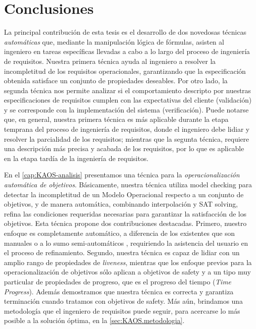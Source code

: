 \section{Conclusiones}
La principal contribuci\'on de esta tesis es el desarrollo de dos novedosas t\'ecnicas \emph{autom\'aticas} que, mediante la manipulaci\'on l\'ogica de f\'ormulas, asisten al ingeniero en tareas espec\'ificas llevadas a cabo a lo largo del proceso de ingenier\'ia de requisitos. 
Nuestra primera t\'ecnica ayuda al ingeniero a resolver la incompletitud de los requisitos operacionales, garantizando que la especificaci\'on obtenida satisface un conjunto de propiedades deseables. 
Por otro lado, la segunda t\'ecnica nos permite analizar si el comportamiento descripto por nuestras especificaciones de requisitos cumplen con las expectativas del cliente (validaci\'on) y se corresponde con la implementaci\'on del sistema (verificaci\'on).
Puede notarse que, en general, nuestra primera t\'ecnica es m\'as aplicable durante la etapa temprana del proceso de ingenier\'ia de requisitos, donde el ingeniero debe lidiar y resolver la parcialidad de los requisitos; mientras que la segunta t\'ecnica, requiere una descripci\'on m\'as precisa y acabada de los requisitos, por lo que es aplicable en la etapa tard\'ia de la ingenier\'ia de requisitos.


En el \cref{cap:KAOS-analisis} presentamos una t\'ecnica para la \emph{operacionalizaci\'on autom\'atica de objetivos}. B\'asicamente, nuestra t\'ecnica utiliza model checking para detectar la incompletitud de un Modelo Operacional respecto a un conjunto de objetivos, y de manera autom\'atica, combinando interpolaci\'on y SAT solving, refina las condiciones requeridas necesarias para garantizar la satisfacci\'on de los objetivos. Esta t\'ecnica propone dos contribuciones destacadas.
Primero, nuestro enfoque es completamente autom\'atico, a diferencia de los existentes que son manuales \cite{LetierVanLamsweerde2002} o a lo sumo semi-autom\'aticos \cite{Alrajeh+2009}, requiriendo la asistencia del usuario en el proceso de refinamiento. Segundo, nuestra t\'ecnica es capaz de lidiar con un amplio rango de propiedades de \emph{liveness}, mientras que los enfoque previos para la operacionalizaci\'on de objetivos \cite{LetierVanLamsweerde2002,Alrajeh+2009} s\'olo aplican a objetivos de safety y a un tipo muy particular de propiedades de progreso, que es el progreso del tiempo (\textit{Time Progress}).
Adem\'as demostramos que nuestra t\'ecnica es correcta y garantiza terminaci\'on cuando tratamos con objetivos de safety. M\'as a\'un, brindamos una metodolog\'ia que el ingeniero de requisitos puede seguir, para acercarse lo m\'as posible a la soluci\'on \'optima, en la \cref{sec:KAOS.metodologia}.

